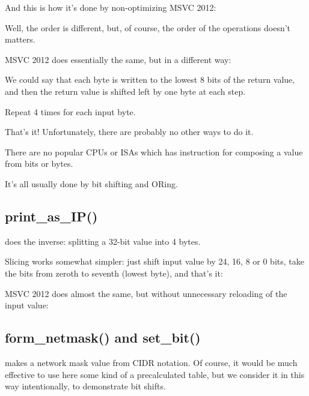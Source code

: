 And this is how it's done by non-optimizing MSVC 2012:



Well, the order is different, but, of course, the order of the operations doesn't matters.

\Optimizing MSVC 2012 does essentially the same, but in a different way:



We could say that each byte is written to the lowest 8 bits of the return value, 
and then the return value is shifted left by one byte at each step.

Repeat 4 times for each input byte.

\par
That's it! Unfortunately, there are probably no other ways to do it.

There are no popular \ac{CPU}s or \ac{ISA}s which has instruction for composing a value from
bits or bytes.

It's all usually done by bit shifting and ORing.

\subsection{print\_as\_IP()}

 does the inverse: splitting a 32-bit value into 4 bytes.

Slicing works somewhat simpler: just shift input value by 24, 16, 8 or 0 bits, take the 
bits from zeroth to seventh (lowest byte), and that's it:



\Optimizing MSVC 2012 does almost the same, but without unnecessary reloading of the input value:



\subsection{form\_netmask() and set\_bit()}

 makes a network mask value from \ac{CIDR} notation.
Of course, it would be much effective to use here some kind of a precalculated table, but we consider it in this
way intentionally, to demonstrate bit shifts.

